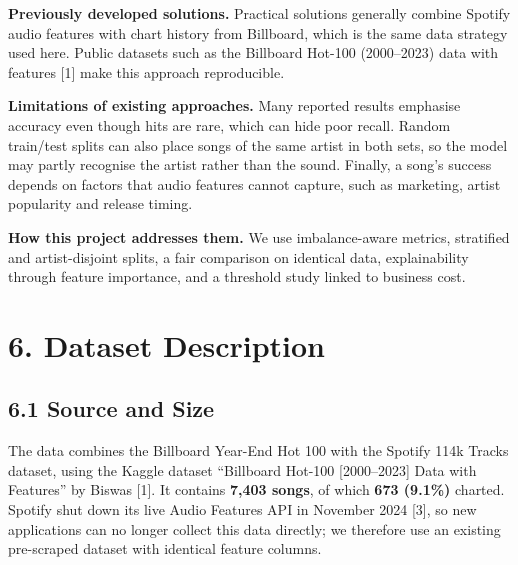 \documentclass[11pt,a4paper]{article}
\begin{document}
\textbf{Previously developed solutions.} Practical solutions generally combine Spotify audio features with chart history from Billboard, which is the same data strategy used here. Public datasets such as the Billboard Hot-100 (2000--2023) data with features [1] make this approach reproducible.

\textbf{Limitations of existing approaches.} Many reported results emphasise accuracy even though hits are rare, which can hide poor recall. Random train/test splits can also place songs of the same artist in both sets, so the model may partly recognise the artist rather than the sound. Finally, a song's success depends on factors that audio features cannot capture, such as marketing, artist popularity and release timing.

\textbf{How this project addresses them.} We use imbalance-aware metrics, stratified and artist-disjoint splits, a fair comparison on identical data, explainability through feature importance, and a threshold study linked to business cost.

\section*{6. Dataset Description}
\subsection*{6.1 Source and Size}
The data combines the Billboard Year-End Hot 100 with the Spotify 114k Tracks dataset, using the Kaggle dataset ``Billboard Hot-100 [2000--2023] Data with Features'' by Biswas [1]. It contains \textbf{7,403 songs}, of which \textbf{673 (9.1\%)} charted. Spotify shut down its live Audio Features API in November 2024 [3], so new applications can no longer collect this data directly; we therefore use an existing pre-scraped dataset with identical feature columns.
\end{document}
